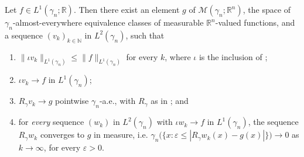 \begin{lemma}
Let $f \in L^1(\gamma_n;\mathbb{R})$.  Then there exist an element $g$ of
$\mathcal{M}(\gamma_n;\mathbb{R}^n)$, the space of $\gamma_n$-almost-everywhere
equivalence classes of measurable $\mathbb{R}^n$-valued functions, and a sequence
$(v_k)_{k \in \mathbb{N}}$ in $L^2(\gamma_n)$, such that
\begin{enumerate}
\item $\|\iota v_k\|_{L^1(\gamma_n)} \leq \|f\|_{L^1(\gamma_n)}$ for every $k$, where
$\iota$ is the inclusion of ;
\item $\iota v_k \to f$ in $L^1(\gamma_n)$;
\item $R_\gamma v_k \to g$ pointwise $\gamma_n$-a.e., with $R_\gamma$ as in
; and
\item for \emph{every} sequence $(w_k)$ in $L^2(\gamma_n)$ with $\iota w_k \to f$ in
$L^1(\gamma_n)$, the sequence $R_\gamma w_k$ converges to $g$ in measure, i.e.
$\gamma_n\bigl(\{x : \varepsilon \leq |R_\gamma w_k(x) - g(x)|\}\bigr) \to 0$ as
$k \to \infty$, for every $\varepsilon > 0$.
\end{enumerate}
\end{lemma}
